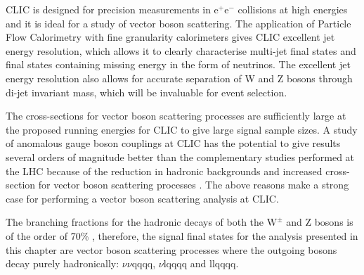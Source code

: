 CLIC is designed for precision measurements in $\text{e}^{+}\text{e}^{-}$ collisions at high energies and it is ideal for a study of vector boson scattering.  The application of Particle Flow Calorimetry with fine granularity calorimeters gives CLIC excellent jet energy resolution, which allows it to clearly characterise multi-jet final states and final states containing missing energy in the form of neutrinos.  The excellent jet energy resolution also allows for accurate separation of W and Z bosons through di-jet invariant mass, which will be invaluable for event selection.  

The cross-sections for vector boson scattering processes are sufficiently large at the proposed running energies for CLIC to give large signal sample sizes.  A study of anomalous gauge boson couplings at CLIC has the potential to give results several orders of magnitude better than the complementary studies performed at the LHC because of the reduction in hadronic backgrounds and increased cross-section for vector boson scattering processes \cite{Aad:2014zda}.  The above reasons make a strong case for performing a vector boson scattering analysis at CLIC.  

The branching fractions for the hadronic decays of both the $\text{W}^{\pm}$ and Z bosons is of the order of 70\% \cite{Beringer:1900zz}, therefore, the signal final states for the analysis presented in this chapter are vector boson scattering processes where the outgoing bosons decay purely hadronically: $\nu\nu\text{qqqq}$, $\nu\text{lqqqq}$ and llqqqq.  


